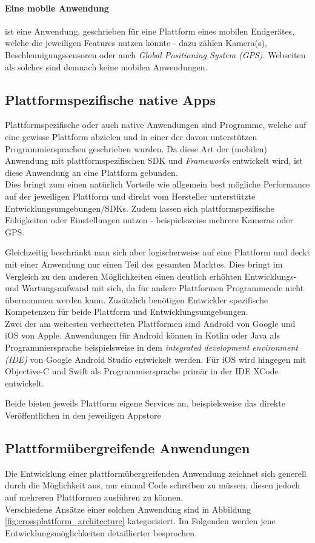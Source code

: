 \paragraph{Eine mobile Anwendung} ist eine Anwendung, geschrieben für eine Plattform eines mobilen Endgerätes, welche die jeweiligen Features nutzen könnte - dazu zählen Kamera(s), Beschleunigungssensoren oder auch \textit{Global Positioning System (GPS)}. Webseiten als solches sind demnach keine mobilen Anwendungen.


\subsection{Plattformspezifische native Apps}
Plattformspezifische oder auch native Anwendungen sind Programme, welche auf eine gewisse Plattform abzielen und in einer der davon unterstützen Programmiersprachen geschrieben wurden. Da diese Art der (mobilen) Anwendung mit plattformspezifischen  SDK und \textit{Frameworks} entwickelt wird, ist diese Anwendung an eine Plattform gebunden. \\
Dies bringt zum einen natürlich Vorteile wie allgemein best mögliche Performance auf der jeweiligen Plattform und direkt vom Hersteller unterstützte Entwicklungsumgebungen/SDKs.
Zudem lassen sich plattformspezifische Fähigkeiten oder Einstellungen nutzen - beispielsweise mehrere Kameras oder GPS.

Gleichzeitig beschränkt man sich aber logischerweise auf eine Plattform und deckt mit einer Anwendung nur einen Teil des gesamten Marktes. Dies bringt im Vergleich zu den anderen Möglichkeiten einen deutlich erhöhten Entwicklungs- und Wartungsaufwand mit sich, da für andere Plattformen Programmcode nicht übernommen werden kann. Zusätzlich benötigen Entwickler spezifische Kompetenzen für beide Plattform und Entwicklungsumgebungen. \\

Zwei der am weitesten verbreiteten Plattformen sind Android von Google und iOS von Apple. Anwendungen für Android können in Kotlin oder Java als Programmiersprache beispielsweise in dem \textit{integrated development environment (IDE)} von Google Android Studio entwickelt werden. Für iOS wird hingegen mit Objective-C und Swift als Programmiersprache primär in der IDE XCode entwickelt.

Beide bieten jeweils Plattform eigene Services an, beispielsweise das direkte Veröffentlichen in den jeweiligen Appstore \cite{fentaw2020}

\subsection{Plattformübergreifende Anwendungen}
\label{plattformuebergreifende_anwendungen}
Die Entwicklung einer plattformübergreifenden Anwendung zeichnet sich generell durch die Möglichkeit aus, nur einmal Code schreiben zu müssen, diesen jedoch auf mehreren Plattformen ausführen zu können. \\
Verschiedene Ansätze einer solchen Anwendung sind in Abbildung \ref{fig:crossplattform_architecture} kategorisiert. Im Folgenden werden jene Entwicklungsmöglichkeiten detaillierter besprochen.

